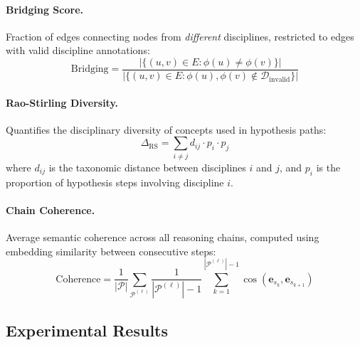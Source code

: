 \paragraph{Bridging Score.}
Fraction of edges connecting nodes from \emph{different} disciplines, restricted to edges with valid discipline annotations:
\begin{equation}
    \text{Bridging} = \frac{|\{(u,v) \in E : \phi(u) \neq \phi(v)\}|}{|\{(u,v) \in E : \phi(u), \phi(v) \notin \mathcal{D}_{\text{invalid}}\}|}
\end{equation}

\paragraph{Rao-Stirling Diversity.}
Quantifies the disciplinary diversity of concepts used in hypothesis paths:
\begin{equation}
    \Delta_{\text{RS}} = \sum_{i \neq j} d_{ij} \cdot p_i \cdot p_j
\end{equation}
where $d_{ij}$ is the taxonomic distance between disciplines $i$ and $j$, and $p_i$ is the proportion of hypothesis steps involving discipline $i$.

\paragraph{Chain Coherence.}
Average semantic coherence across all reasoning chains, computed using embedding similarity between consecutive steps:
\begin{equation}
    \text{Coherence} = \frac{1}{|\mathcal{P}|} \sum_{\mathcal{P}^{(\ell)}} \frac{1}{|\mathcal{P}^{(\ell)}|-1} \sum_{k=1}^{|\mathcal{P}^{(\ell)}|-1} \cos(\mathbf{e}_{s_k}, \mathbf{e}_{s_{k+1}})
\end{equation}



\subsection{Experimental Results}


